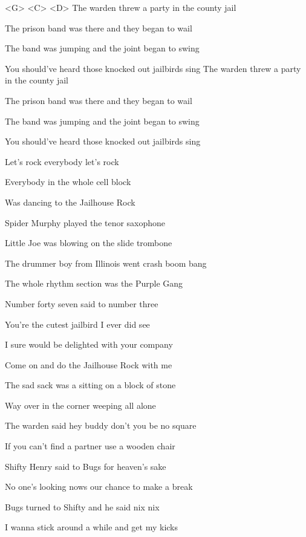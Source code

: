 
\ifdefined\TPBAND
<G> <C> <D>
\zs
The warden threw a party in the county jail

The prison band was there and they began to wail

The band was jumping and the joint began to swing

You should've heard those knocked out jailbirds sing
\ks
\else
\zs
The warden threw a party in the county jail

The prison band was there and they began to wail

The band was jumping and the joint began to swing

You should've heard those knocked out jailbirds sing
\ks
\fi

\zr
Let's rock everybody let's rock

Everybody in the whole cell block

Was dancing to the Jailhouse Rock
\kr

\zs
Spider Murphy played the tenor saxophone

Little Joe was blowing on the slide trombone

The drummer boy from Illinois went crash boom bang

The whole rhythm section was the Purple Gang
\ks

\zr
\kr

\zs
Number forty seven said to number three

You're the cutest jailbird I ever did see

I sure would be delighted with your company

Come on and do the Jailhouse Rock with me
\ks

\zr
\kr

\zs
The sad sack was a sitting on a block of stone

Way over in the corner weeping all alone

The warden said hey buddy don't you be no square

If you can't find a partner use a wooden chair
\ks

\zr
\kr

\zs
Shifty Henry said to Bugs for heaven's sake

No one's looking nows our chance to make a break

Bugs turned to Shifty and he said nix nix

I wanna stick around a while and get my kicks
\ks

\zr
\kr

\kp
